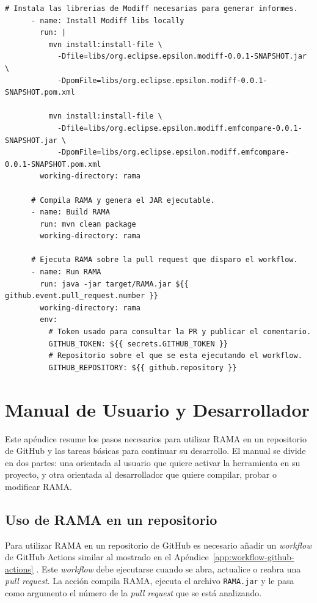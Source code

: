 \documentclass[11pt]{article}
\begin{document}
\begin{lstlisting}[caption={Ejemplo de \textit{Workflow} de GitHub Actions.},label={lst:workflow-github-actions}]
      # Instala las librerias de Modiff necesarias para generar informes.
      - name: Install Modiff libs locally
        run: |
          mvn install:install-file \
            -Dfile=libs/org.eclipse.epsilon.modiff-0.0.1-SNAPSHOT.jar \
            -DpomFile=libs/org.eclipse.epsilon.modiff-0.0.1-SNAPSHOT.pom.xml

          mvn install:install-file \
            -Dfile=libs/org.eclipse.epsilon.modiff.emfcompare-0.0.1-SNAPSHOT.jar \
            -DpomFile=libs/org.eclipse.epsilon.modiff.emfcompare-0.0.1-SNAPSHOT.pom.xml
        working-directory: rama

      # Compila RAMA y genera el JAR ejecutable.
      - name: Build RAMA
        run: mvn clean package
        working-directory: rama

      # Ejecuta RAMA sobre la pull request que disparo el workflow.
      - name: Run RAMA
        run: java -jar target/RAMA.jar ${{ github.event.pull_request.number }}
        working-directory: rama
        env:
          # Token usado para consultar la PR y publicar el comentario.
          GITHUB_TOKEN: ${{ secrets.GITHUB_TOKEN }}
          # Repositorio sobre el que se esta ejecutando el workflow.
          GITHUB_REPOSITORY: ${{ github.repository }}
\end{lstlisting}

\newpage

\section{Manual de Usuario y Desarrollador}
\label{app:manual-usuario-desarrollador}

Este apéndice resume los pasos necesarios para utilizar RAMA en un repositorio de GitHub y las tareas básicas para continuar su desarrollo. El manual se divide en dos partes: una orientada al usuario que quiere activar la herramienta en su proyecto, y otra orientada al desarrollador que quiere compilar, probar o modificar RAMA.

\subsection{Uso de RAMA en un repositorio}

Para utilizar RAMA en un repositorio de GitHub es necesario añadir un \textit{workflow} de GitHub Actions similar al mostrado en el Apéndice~\ref{app:workflow-github-actions} \cite{github-actions}. Este \textit{workflow} debe ejecutarse cuando se abra, actualice o reabra una \textit{pull request}. La acción compila RAMA, ejecuta el archivo \texttt{RAMA.jar} y le pasa como argumento el número de la \textit{pull request} que se está analizando.
\end{document}
